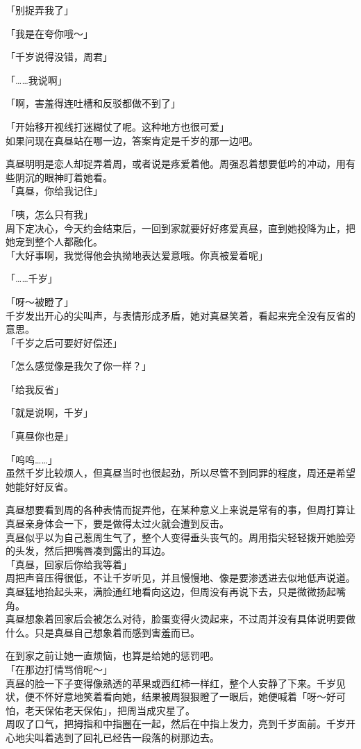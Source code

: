 「别捉弄我了」

「我是在夸你哦～」

「千岁说得没错，周君」

「……我说啊」

「啊，害羞得连吐槽和反驳都做不到了」

「开始移开视线打迷糊仗了呢。这种地方也很可爱」\\

如果问现在真昼站在哪一边，答案肯定是千岁的那一边吧。

真昼明明是恋人却捉弄着周，或者说是疼爱着他。周强忍着想要低吟的冲动，用有些阴沉的眼神盯着她看。\\

「真昼，你给我记住」

「咦，怎么只有我」\\

周下定决心，今天约会结束后，一回到家就要好好疼爱真昼，直到她投降为止，把她宠到整个人都融化。\\

「大好事啊，我觉得他会执拗地表达爱意哦。你真被爱着呢」

「……千岁」

「呀～被瞪了」\\

千岁发出开心的尖叫声，与表情形成矛盾，她对真昼笑着，看起来完全没有反省的意思。\\

「千岁之后可要好好偿还」

「怎么感觉像是我欠了你一样？」

「给我反省」

「就是说啊，千岁」

「真昼你也是」

「呜呜……」\\

虽然千岁比较烦人，但真昼当时也很起劲，所以尽管不到同罪的程度，周还是希望她能好好反省。

真昼想要看到周的各种表情而捉弄他，在某种意义上来说是常有的事，但周打算让真昼亲身体会一下，要是做得太过火就会遭到反击。\\

真昼似乎以为自己惹周生气了，整个人变得垂头丧气的。周用指尖轻轻拨开她脸旁的头发，然后把嘴唇凑到露出的耳边。\\

「真昼，回家后你给我等着」\\

周把声音压得很低，不让千岁听见，并且慢慢地、像是要渗透进去似地低声说道。真昼猛地抬起头来，满脸通红地看向这边，但周没有再说下去，只是微微扬起嘴角。\\

真昼想象着回家后会被怎么对待，脸蛋变得火烫起来，不过周并没有具体说明要做什么。只是真昼自己想象着而感到害羞而已。

在到家之前让她一直烦恼，也算是给她的惩罚吧。\\

「在那边打情骂俏呢～」\\

真昼的脸一下子变得像熟透的苹果或西红柿一样红，整个人安静了下来。千岁见状，便不怀好意地笑着看向她，结果被周狠狠瞪了一眼后，她便喊着「呀～好可怕，老天保佑老天保佑」，把周当成灾星了。\\

周叹了口气，把拇指和中指圈在一起，然后在中指上发力，亮到千岁面前。千岁开心地尖叫着逃到了回礼已经告一段落的树那边去。
